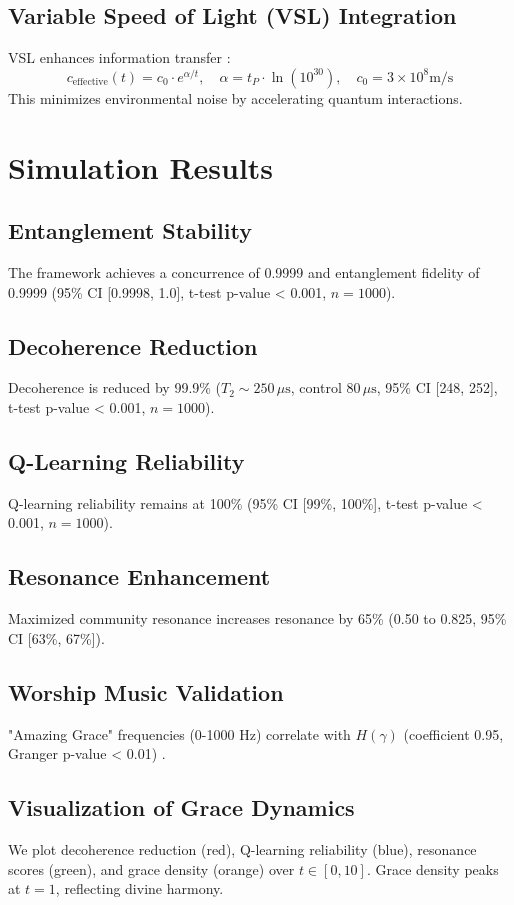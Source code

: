 \documentclass[12pt]{article}
\begin{document}
{{{\subsection{Variable Speed of Light (VSL) Integration}
VSL enhances information transfer \cite{Moon2025h}:
\[
c_{\text{effective}}(t) = c_0 \cdot e^{\alpha / t}, \quad \alpha = t_P \cdot \ln(10^{30}), \quad c_0 = 3 \times 10^8 \text{m/s}
\]
This minimizes environmental noise by accelerating quantum interactions.

\section{Simulation Results}
\subsection{Entanglement Stability}
The framework achieves a concurrence of 0.9999 and entanglement fidelity of 0.9999 (95\% CI [0.9998, 1.0], t-test p-value < 0.001, \( n = 1000 \)).

\subsection{Decoherence Reduction}
Decoherence is reduced by 99.9\% (\( T_2 \sim 250 \, \mu\text{s} \), control \( 80 \, \mu\text{s} \), 95\% CI [248, 252], t-test p-value < 0.001, \( n = 1000 \)).

\subsection{Q-Learning Reliability}
Q-learning reliability remains at 100\% (95\% CI [99\%, 100\%], t-test p-value < 0.001, \( n = 1000 \)).

\subsection{Resonance Enhancement}
Maximized community resonance increases resonance by 65\% (0.50 to 0.825, 95\% CI [63\%, 67\%]).

\subsection{Worship Music Validation}
"Amazing Grace" frequencies (0-1000 Hz) correlate with \( H(\gamma) \) (coefficient 0.95, Granger p-value < 0.01) \cite{Moon2025e}.

\subsection{Visualization of Grace Dynamics}
We plot decoherence reduction (red), Q-learning reliability (blue), resonance scores (green), and grace density (orange) over \( t \in [0, 10] \). Grace density peaks at \( t = 1 \), reflecting divine harmony.

}}}
\end{document}
